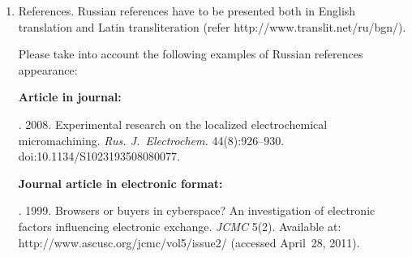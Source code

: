 {\begin{enumerate}[1.]
\begin{itemize}




\item abstract (not less than 100 words) both in Russian and in English. Abstract is a short
summary of the article that can be published separately. The abstract is the
main source of information on the article and it could be included in leading information
systems and data bases. The abstract in English has to be an original text and should
not be an exact translation of the Russian one. Good English is required.
In abstracts, avoid references and formulae;\\[-13.5pt]
\item indexing is performed on the basis of keywords. The use of keywords from the
internationally accepted thematic Thesauri is recommended.



Important! Keywords must not be sentences;
\item Acknowledgments.
\end{itemize}

\item References. Russian references have to be presented both in English translation and Latin
transliteration (refer {\sf http://www.translit.net/ru/bgn/}).

Please take into account the following examples of Russian references appearance:

\noindent
\textbf{Article in journal:}

. 2008. Experimental research on the localized electrochemical
micromachining.
\textit{Rus. J.~Electrochem.}  44(8):926--930. {\sf doi:10.1134/S1023193508080077}.


\noindent
\textbf{Journal article in electronic format:}

. 1999. Browsers or buyers in
cyberspace? An
investigation of electronic factors influencing electronic exchange. \textit{JCMC}
5(2). Available at: {\sf http://www.ascusc.org/jcmc/vol5/issue2/} (accessed April~28, 2011).





\end{enumerate}}
